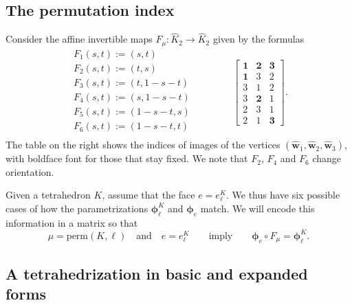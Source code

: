 \documentclass[10pt,english]{article}
\newcommand{\ds}{\displaystyle}
\begin{document}
\subsection{The permutation index}\label{sec:1.4}

Consider the affine invertible maps $F_\mu:\widehat K_2\to\widehat K_2$ given by the formulas
\[
\begin{array}{l}
\ds F_1(s,t) := (s,t)\\[1.5ex] 
\ds F_2(s,t) := (t,s)\\[1.5ex] 
\ds F_3(s,t) := (t,1-s-t)\\[1.5ex] 
\ds F_4(s,t) := (s,1-s-t)\\[1.5ex] 
\ds F_5(s,t) := (1-s-t,s)\\[1.5ex] 
\ds F_6(s,t) := (1-s-t,t)\\[1.5ex] 
\end{array} \qquad \qquad 
\left[\begin{array}{ccc} \mathbf 1 & \mathbf 2 & \mathbf 3 \\[1.5ex] \mathbf 1 & 3 & 2 \\[1.5ex] 3 & 1 & 2 \\[1.5ex] 3 & \mathbf 2 & 1 \\[1.5ex] 2 & 3 & 1 \\[1.5ex] 2 & 1 & \mathbf 3\end{array}\right].
\]
The table on the right shows the indices of images of the vertices $(\widehat{\mathbf w}_1,\widehat{\mathbf w}_2,\widehat{\mathbf w}_3)$, with boldface font for those that stay fixed. We note that $F_2$, $F_4$ and $F_6$ change orientation.

Given a tetrahedron $K$, assume that the face $e=e_\ell^K$. We thus have six possible cases 
of how the parametrizations $\boldsymbol\phi_\ell^K$ and $\boldsymbol\phi_e$ match. We will encode this information in a matrix so that
\[
\mu=\mathrm{perm}(K,\ell)\quad\mbox{and} \quad e=e_\ell^K  \qquad \mbox{imply}\qquad \boldsymbol\phi_e\circ F_\mu=\boldsymbol\phi_\ell^K.
\]

\subsection{A tetrahedrization in basic and expanded forms}
\end{document}
